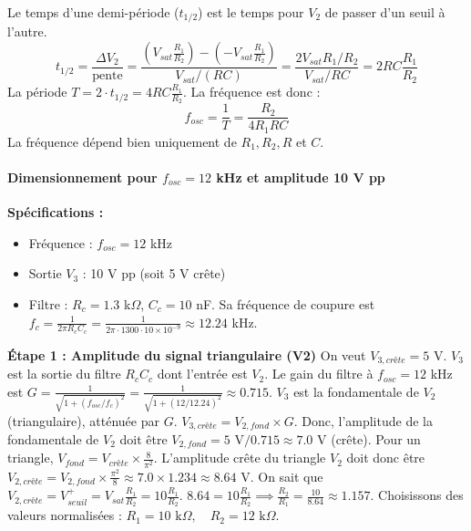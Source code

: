 \documentclass[11pt,a4paper]{article}
\begin{document}
Le temps d'une demi-période ($t_{1/2}$) est le temps pour $V_2$ de passer d'un seuil à l'autre.
\begin{equation}
t_{1/2} = \frac{\Delta V_2}{\text{pente}} = \frac{ (V_{sat} \frac{R_1}{R_2}) - (-V_{sat} \frac{R_1}{R_2}) }{V_{sat} / (RC)} = \frac{2 V_{sat} R_1 / R_2}{V_{sat} / RC} = 2 RC \frac{R_1}{R_2}
\end{equation}
La période $T = 2 \cdot t_{1/2} = 4 RC \frac{R_1}{R_2}$. La fréquence est donc :
\begin{equation}
\boxed{f_{osc} = \frac{1}{T} = \frac{R_2}{4 R_1 RC}}
\end{equation}
La fréquence dépend bien uniquement de $R_1, R_2, R$ et $C$.

\paragraph{Dimensionnement pour $f_{osc} = 12$ kHz et amplitude 10 V pp}

\textbf{Spécifications :}
\begin{itemize}
    \item Fréquence : $f_{osc} = 12$ kHz
    \item Sortie $V_3$ : 10 V pp (soit 5 V crête)
    \item Filtre : $R_c = 1.3$ k$\Omega$, $C_c = 10$ nF.
    Sa fréquence de coupure est $f_c = \frac{1}{2\pi R_c C_c} = \frac{1}{2\pi \cdot 1300 \cdot 10 \times 10^{-9}} \approx 12.24$ kHz.
\end{itemize}

\textbf{Étape 1 : Amplitude du signal triangulaire (V2)}
On veut $V_{3,crête} = 5$ V. $V_3$ est la sortie du filtre $R_c C_c$ dont l'entrée est $V_2$.
Le gain du filtre à $f_{osc}=12$ kHz est $G = \frac{1}{\sqrt{1+(f_{osc}/f_c)^2}} = \frac{1}{\sqrt{1+(12/12.24)^2}} \approx 0.715$.
$V_3$ est la fondamentale de $V_2$ (triangulaire), atténuée par $G$.
$V_{3,crête} = V_{2,fond} \times G$.
Donc, l'amplitude de la fondamentale de $V_2$ doit être $V_{2,fond} = 5 \text{ V} / 0.715 \approx 7.0$ V (crête).
Pour un triangle, $V_{fond} = V_{crête} \times \frac{8}{\pi^2}$.
L'amplitude crête du triangle $V_2$ doit donc être $V_{2,crête} = V_{2,fond} \times \frac{\pi^2}{8} \approx 7.0 \times 1.234 \approx 8.64$ V.
On sait que $V_{2,crête} = V_{seuil}^+ = V_{sat} \frac{R_1}{R_2} = 10 \frac{R_1}{R_2}$.
$8.64 = 10 \frac{R_1}{R_2} \implies \frac{R_2}{R_1} = \frac{10}{8.64} \approx 1.157$.
Choisissons des valeurs normalisées : $\boxed{R_1 = 10 \text{ k}\Omega, \quad R_2 = 12 \text{ k}\Omega}$.
\end{document}
